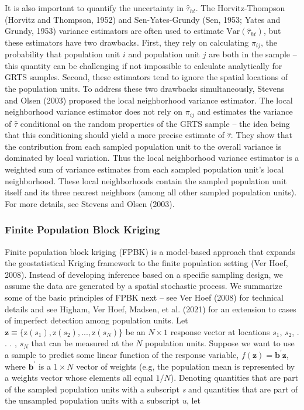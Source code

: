 \documentclass[]{elsarticle} %
\begin{document}
It is also important to quantify the uncertainty in \(\hat{\tau}_{ht}\).
The Horvitz-Thompson (Horvitz and Thompson, 1952) and Sen-Yates-Grundy
(Sen, 1953; Yates and Grundy, 1953) variance estimators are often used
to estimate \(\text{Var}(\hat{\tau}_{ht})\), but these estimators have
two drawbacks. First, they rely on calculating \(\pi_{ij}\), the
probability that population unit \(i\) and population unit \(j\) are
both in the sample -- this quantity can be challenging if not impossible
to calculate analytically for GRTS samples. Second, these estimators
tend to ignore the spatial locations of the population units. To address
these two drawbacks simultaneously, Stevens and Olsen (2003) proposed
the local neighborhood variance estimator. The local neighborhood
variance estimator does not rely on \(\pi_{ij}\) and estimates the
variance of \(\hat{\tau}\) conditional on the random properties of the
GRTS sample -- the idea being that this conditioning should yield a more
precise estimate of \(\hat{\tau}\). They show that the contribution from
each sampled population unit to the overall variance is dominated by
local variation. Thus the local neighborhood variance estimator is a
weighted sum of variance estimates from each sampled population unit's
local neighborhood. These local neighborhoods contain the sampled
population unit itself and its three nearest neighbors (among all other
sampled population units). For more details, see Stevens and Olsen
(2003).

\hypertarget{finite-population-block-kriging}{%
\subsubsection{Finite Population Block
Kriging}\label{finite-population-block-kriging}}

Finite population block kriging (FPBK) is a model-based approach that
expands the geostatistical Kriging framework to the finite population
setting (Ver Hoef, 2008). Instead of developing inference based on a
specific sampling design, we assume the data are generated by a spatial
stochastic process. We summarize some of the basic principles of FPBK
next -- see Ver Hoef (2008) for technical details and see Higham, Ver
Hoef, Madsen, et al. (2021) for an extension to cases of imperfect
detection among population units. Let
\({\mathbf{z} \equiv \{\text{z}(s_1), \text{z}(s_2), . . . , \text{z}(s_N) \}}\)
be an \(N \times 1\) response vector at locations \(s_1\), \(s_2\), . .
. , \(s_N\) that can be measured at the \(N\) population units. Suppose
we want to use a sample to predict some linear function of the response
variable, \(f(\mathbf{z}) = \mathbf{b}^\prime \mathbf{z}\), where
\(\mathbf{b}^\prime\) is a \(1 \times N\) vector of weights (e.g, the
population mean is represented by a weights vector whose elements all
equal \(1 / N\)). Denoting quantities that are part of the sampled
population units with a subscript \emph{s} and quantities that are part
of the unsampled population units with a subscript \emph{u}, let
\end{document}
